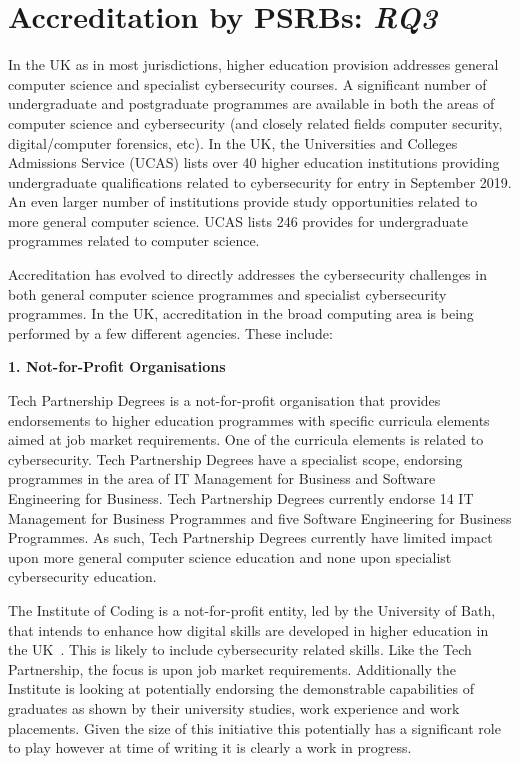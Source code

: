\documentclass[conference]{IEEEtran}
\begin{document}

\section{Accreditation by PSRBs: {\emph{RQ3}}}

In the UK as in most jurisdictions, higher education provision addresses general computer science and specialist cybersecurity courses. A significant number of undergraduate and postgraduate programmes are available in both the areas of computer science and cybersecurity (and closely related fields computer security, digital/computer forensics, etc). In the UK, the Universities and Colleges Admissions Service (UCAS) lists over 40 higher education institutions providing undergraduate qualifications related to cybersecurity for entry in September 2019. An even larger number of institutions provide study opportunities related to more general computer science. UCAS lists 246 provides for undergraduate programmes related to computer science. 

Accreditation has evolved to directly addresses the cybersecurity challenges in both general computer science programmes and specialist cybersecurity programmes. In the UK, accreditation in the broad computing area is being performed by a few different agencies. These include:

\textbf{1. Not-for-Profit Organisations}

Tech Partnership Degrees is a not-for-profit organisation that provides endorsements to higher education programmes with specific curricula elements aimed at job market requirements. One of the curricula elements is related to cybersecurity. Tech Partnership Degrees have a specialist scope, endorsing programmes in the area of IT Management for Business and Software Engineering for Business. Tech Partnership Degrees currently endorse 14 IT Management for Business Programmes and five Software Engineering for Business Programmes. As such, Tech Partnership Degrees currently have limited impact upon more general computer science education and none upon specialist cybersecurity education. 

The Institute of Coding is a not-for-profit entity, led by the University of Bath, that intends to enhance how digital skills are developed in higher education in the UK~\cite{Davenportetal2019a}. This is likely to include cybersecurity related skills. Like the Tech Partnership, the focus is upon job market requirements. Additionally the Institute is looking at potentially endorsing the demonstrable capabilities of graduates as shown by their university studies, work experience and work placements. Given the size of this initiative this potentially has a significant role to play however at time of writing it is clearly a work in progress.
\end{document}

